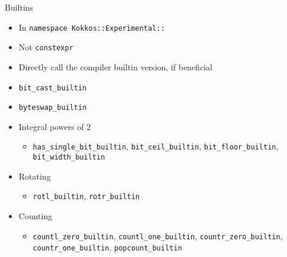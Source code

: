 
\begin{frame}[fragile]{Builtins}
	\begin{itemize}
		\item In \texttt{namespace Kokkos::Experimental::}
		\item Not \texttt{constexpr}
		\item Directly call the compiler builtin version, if beneficial
		      \vfill
		\item \texttt{bit\_cast\_builtin}
		\item \texttt{byteswap\_builtin}
		\item Integral powers of 2
		      \begin{itemize}
                         \item \texttt{has\_single\_bit\_builtin}, \texttt{bit\_ceil\_builtin}, \texttt{bit\_floor\_builtin}, \texttt{bit\_width\_builtin}
		      \end{itemize}
		\item Rotating
		      \begin{itemize}
                         \item \texttt{rotl\_builtin}, \texttt{rotr\_builtin}
		      \end{itemize}
		\item Counting
		      \begin{itemize}
                         \item \texttt{countl\_zero\_builtin}, \texttt{countl\_one\_builtin}, \texttt{countr\_zero\_builtin}, \texttt{countr\_one\_builtin}, \texttt{popcount\_builtin}
		      \end{itemize}
	\end{itemize}
\end{frame}

